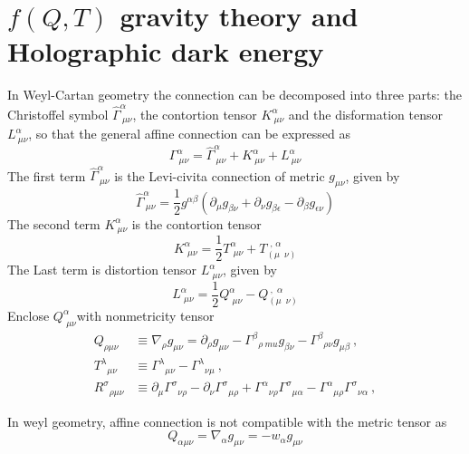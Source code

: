 \documentclass{ws-mpla}
\begin{document}
\section{$f(Q,T)$ gravity theory and Holographic dark energy}
In Weyl-Cartan geometry the connection can be decomposed into three parts: the Christoffel symbol $\hat{\Gamma}^\alpha_{\ \mu \nu}$, the contortion tensor $K^\alpha_{\ \mu \nu}$ and the disformation tensor $L^\alpha_{\ \mu \nu}$, so that the general affine connection can be expressed as
\begin{equation}
    \Gamma^\alpha_{\ \mu \nu}=\hat{\Gamma}^\alpha_{\ \mu \nu}+K^\alpha_{\ \mu \nu}+L^\alpha_{\ \mu \nu}
\end{equation}
The first term $\hat{\Gamma}^\alpha_{\ \mu \nu}$ is the Levi-civita connection of metric $g_{\mu\nu}$, given by
\begin{equation}
\hat{\Gamma}^\alpha_{\ \mu \nu}=\frac{1}{2}g^{\alpha \beta}(\partial_\mu g_{\beta \nu}+\partial_\nu g_{\beta \epsilon}-\partial_\beta g_{\epsilon \nu})
\end{equation}
The second term $K^\alpha_{\ \mu \nu}$ is the contortion tensor 
\begin{equation}
 K^{\alpha}_{\,\,\mu\nu} =\frac{1}{2}T^{\alpha}_{\,\,\mu\nu} +T^{\,\ ,\,\alpha}_{(\mu\,\,\,\nu)}
\end{equation}
The Last term is distortion tensor $L^{\alpha}_{\,\,\mu\nu}$, given by
\begin{equation}
L^{\alpha}_{\,\,\mu\nu} = \frac{1}{2}Q^{\alpha}_{\,\,\mu\nu}-Q^{\ ,\,\,\alpha}_{(\mu\,\,\,\nu)}
\end{equation}
Enclose $Q^{\alpha}_{\,\,\mu\nu}$with nonmetricity tensor
\begin{align}
Q_{\rho \mu\nu} &\equiv \nabla_{\rho} g_{\mu\nu} = \partial_\rho g_{\mu\nu} - \Gamma^\beta{}_{\rho\ mu} g_{\beta\nu} - \Gamma^\beta{}_{\rho\nu} g_{\mu\beta}~, \\
T^{\lambda}{}_{\mu\nu} &\equiv
 \Gamma^{\lambda}{}_{\mu\nu}\!-\!\Gamma^{\lambda}{}_{\nu\mu}~ ,\\
 R^{\sigma}{}_{\rho\mu\nu} &\equiv \partial_{\mu} \Gamma^{\sigma}{}_{\nu\rho}\! - \! \partial_{\nu} \Gamma^{\sigma}{}_{\mu\rho}\! +\! \Gamma^{\alpha}{}_{\nu\rho} \Gamma^{\sigma}{}_{\mu\alpha} \!-\!\Gamma^{\alpha}{}_{\mu \rho} \Gamma^{\sigma}{}_{\nu\alpha}~ ,
\end{align}

In weyl geometry, affine connection is not compatible with the metric tensor as 
\begin{equation}
    Q_{\alpha \mu \nu}=\nabla_\alpha g_{\mu \nu}=-w_\alpha g_{\mu \nu}
\end{equation}
\end{document}
